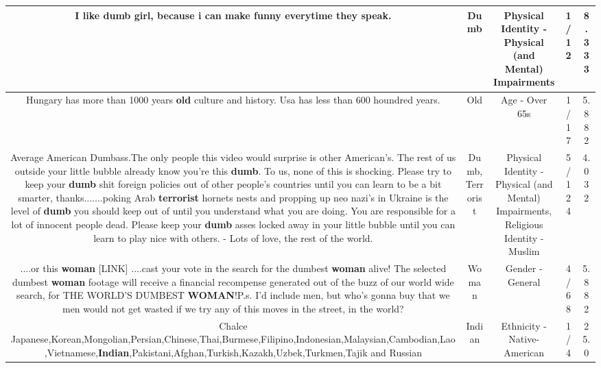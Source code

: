 \documentclass[11pt]{article}
\newlength\mylength
\begin{document}
\begin{center}
\begin{longtable}{|C{.65\mylength}|C{.30\mylength}|C{.12\mylength}|C{.12\mylength}|C{.12\mylength}|}
  \small I like \textbf{dumb} girl, because i can make funny everytime they speak.\normalsize   & Dumb & Physical Identity - Physical (and Mental) Impairments & 1/12 & 8.333 \\  \hline
  \small Hungary has more than 1000 years \textbf{old} culture and  history. Usa  has less than 600 houndred years.\normalsize   & Old & Age - Over 65s & 1/17 & 5.882 \\  \hline
  \small Average American Dumbass.The only people this video would surprise is other American's.    The rest of us outside your little bubble already know you're this \textbf{dumb}.    To us, none of this is shocking.   Please try to keep your \textbf{dumb} shit foreign policies out of other people's countries until you can learn to be a bit smarter, thanks.......poking Arab \textbf{terrorist} hornets nests and propping up neo nazi's in Ukraine is the level of \textbf{dumb} you should keep out of until you understand what you are doing.   You are responsible for a lot of innocent people dead.   Please keep your \textbf{dumb} asses locked away in your little bubble until you can learn to play nice with others. -  Lots of love, the rest of the world.\normalsize   & Dumb, Terrorist & Physical Identity - Physical (and Mental) Impairments, Religious Identity - Muslim & 5/124 & 4.032 \\  \hline
  \small ....or this \textbf{woman}  [LINK]  ....cast your vote in the search for the dumbest \textbf{woman} alive! The selected dumbest \textbf{woman} footage will receive a financial recompense generated out of the buzz of our world wide search, for THE WORLD'S DUMBEST \textbf{WOMAN}!P.s. I'd include men, but who's gonna buy that we men would not get wasted if we try any of this moves in the street, in the world?\normalsize   & Woman & Gender - General & 4/68 & 5.882 \\  \hline
  \small Chalce Japanese,Korean,Mongolian,Persian,Chinese,Thai,Burmese,Filipino,Indonesian,Malaysian,Cambodian,Lao,Vietnamese,\textbf{Indian},Pakistani,Afghan,Turkish,Kazakh,Uzbek,Turkmen,Tajik and Russian\normalsize   & Indian & Ethnicity - Native-American & 1/4 & 25.0 \\  \hline

\end{longtable}
\end{center}
\end{document}
